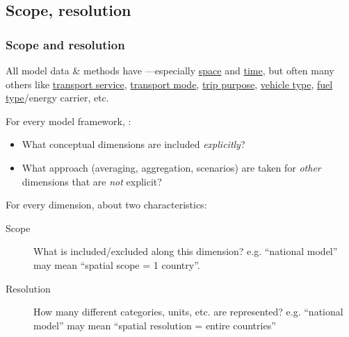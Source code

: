 \documentclass[12pt,aspectratio=169]{beamer}
\begin{document}
\subsection{Scope, resolution}
\begin{frame}
\frametitle{Scope and resolution}
All model data & methods have —especially \uline{space} and \uline{time}, but often many others like \uline{transport service}, \uline{transport mode}, \uline{trip purpose}, \uline{vehicle type}, \uline{fuel type}/energy carrier, etc.

\bigskip
For every model framework, :
\begin{itemize}
  \item What conceptual dimensions are included \emph{explicitly}?
  \item What approach (averaging, aggregation, scenarios) are taken for \emph{other} dimensions that are \emph{not} explicit?
\end{itemize}

\bigskip
For every dimension,  about two characteristics:
\begin{description}
  \item [Scope] What is included/excluded along this dimension?
    e.g. “national model” may mean “spatial scope = 1 country”.
  \item [Resolution] How many different categories, units, etc. are represented?
    e.g. “national model” may mean “spatial resolution = entire countries”
\end{description}

\end{frame}
\end{document}
